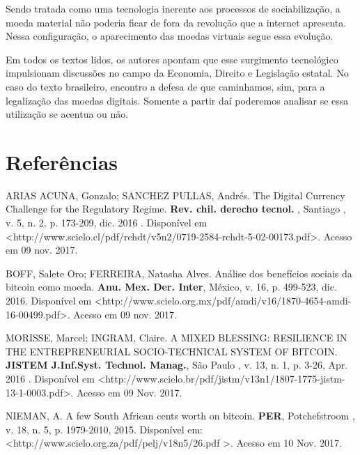 \documentclass[12pt]{article}
\begin{document}
Sendo tratada como uma tecnologia inerente aos processos de sociabilização, a moeda material não poderia ficar de fora da revolução que a internet apresenta. Nessa configuração, o aparecimento das moedas virtuais segue essa evolução.

Em todos os textos lidos, os autores apontam que esse surgimento tecnológico impulsionam discussões no campo da Economia, Direito e Legislação estatal. No caso do texto brasileiro, encontro a defesa de que caminhamos, sim, para a legalização das moedas digitais. Somente a partir daí poderemos analisar se essa utilização se acentua ou não.

\section{Referências}

ARIAS ACUNA, Gonzalo; SANCHEZ PULLAS, Andrés. The Digital Currency Challenge for the Regulatory Regime. \textbf{Rev. chil. derecho tecnol.}  , Santiago , v. 5, n. 2, p. 173-209, dic. 2016 . Disponível em \textless http://www.scielo.cl/pdf/rchdt/v5n2/0719-2584-rchdt-5-02-00173.pdf\textgreater. Acesso em 09 nov. 2017.

\noindent BOFF, Salete Oro; FERREIRA, Natasha Alves. Análise dos benefícios sociais da bitcoin como moeda. \textbf{Anu. Mex. Der. Inter}, México, v. 16, p. 499-523, dic. 2016. Disponível em \textless http://www.scielo.org.mx/pdf/amdi/v16/1870-4654-amdi-16-00499.pdf\textgreater. Acesso em 09 nov. 2017.

\noindent MORISSE, Marcel; INGRAM, Claire. A MIXED BLESSING: RESILIENCE IN THE ENTREPRENEURIAL SOCIO-TECHNICAL SYSTEM OF BITCOIN. \textbf{ JISTEM J.Inf.Syst. Technol. Manag.},  São Paulo ,  v. 13, n. 1, p. 3-26,  Apr.  2016 .   Disponível em \textless http://www.scielo.br/pdf/jistm/v13n1/1807-1775-jistm-13-1-0003.pdf\textgreater. Acesso em  09  Nov.  2017.

\noindent NIEMAN, A. A few South African cents worth on bitcoin. \textbf{PER}, Potchefstroom ,  v. 18, n. 5, p. 1979-2010, 2015.   Disponível em: \textless http://www.scielo.org.za/pdf/pelj/v18n5/26.pdf \textgreater. Acesso em  10  Nov.  2017.
\end{document}
